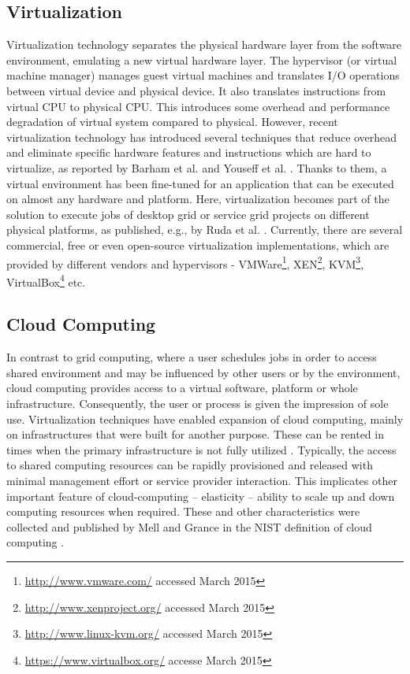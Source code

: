 \subsection{Virtualization}
\label{sec:introvirtual}
Virtualization technology separates the physical hardware layer from the software environment, emulating a new virtual hardware layer. The hypervisor (or virtual machine manager) manages guest virtual machines and translates I/O operations between virtual device and physical device. It also translates instructions from virtual CPU to physical CPU. This introduces some overhead and performance degradation of virtual system compared to physical. However, recent virtualization technology has introduced several techniques that reduce overhead and eliminate specific hardware features and instructions which are hard to virtualize, as reported by Barham et al. and Youseff et al. \cite{Barham2003,Youseff2006}.
Thanks to them, a virtual environment has been fine-tuned for an application that can be executed on almost any hardware and platform. Here, virtualization becomes part of the solution to execute jobs of desktop grid or service grid projects on different physical platforms, as published, e.g., by Ruda et al. \cite{ruda2009virtual}.
Currently, there are several commercial, free or even open-source virtualization implementations, which are provided by different vendors and hypervisors - VMWare\footnote{\url{http://www.vmware.com/} accessed March 2015}, XEN\footnote{\url{http://www.xenproject.org/} accessed March 2015}, KVM\footnote{\url{http://www.linux-kvm.org/} accessed March 2015}, VirtualBox\footnote{\url{https://www.virtualbox.org/} accesse March 2015} etc. 


\subsection{Cloud Computing}
\label{sec:cloud}
In contrast to grid computing, where a user schedules jobs in order to access shared environment and may be influenced by other users or by the environment, cloud computing provides access to a virtual software, platform or whole infrastructure. Consequently, the user or process is given the impression of sole use. Virtualization techniques have enabled expansion of cloud computing, mainly on infrastructures that were built for another purpose. These can be rented in times when the primary infrastructure is not fully utilized \cite{Foster2008}. 
Typically, the access to shared computing resources can be rapidly provisioned and released with minimal management effort or service provider interaction. This implicates other important feature of cloud-computing -- elasticity -- ability to scale up and down computing resources when required. These and other characteristics were collected and published by Mell and Grance in the NIST definition of cloud computing \cite{Mell2011}.


